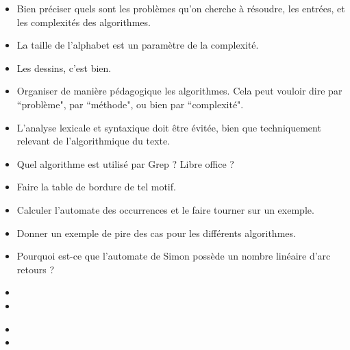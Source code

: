\documentclass{agregfiche}
\begin{document}
\secpieges

\begin{itemize}
    \item Bien préciser quels sont les problèmes qu'on cherche 
        à résoudre, les entrées, et les complexités des algorithmes.

    \item La taille de l'alphabet est un paramètre de la complexité.

    \item Les dessins, c'est bien.

    \item Organiser de manière pédagogique les algorithmes.
        Cela peut vouloir dire par ``problème", par ``méthode", ou 
        bien par ``complexité".

    \item L'analyse lexicale et syntaxique doit être évitée, bien que techniquement
        relevant de l'algorithmique du texte.

\end{itemize}

\secquestionsclassiques

\begin{itemize}
    \item Quel algorithme est utilisé par Grep ? Libre office ?
    \item Faire la table de bordure de tel motif.
    \item Calculer l'automate des occurrences et le faire tourner sur un exemple.
    \item Donner un exemple de pire des cas pour les différents algorithmes.
    \item Pourquoi est-ce que l'automate de Simon possède un nombre linéaire
        d'arc retours ?
\end{itemize}

\secreferences

\begin{itemize}
    \item 
\item 
\end{itemize}

\secdev

\begin{itemize}
    \item 
    \item 
\end{itemize}
\end{document}
